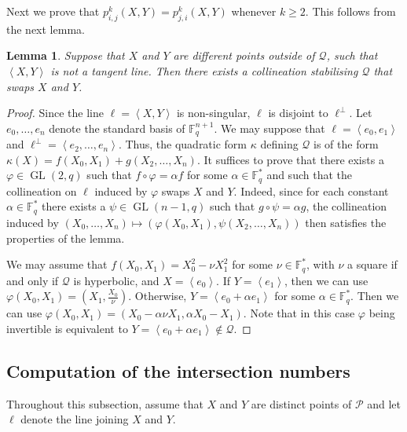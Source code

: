 \documentclass[a4paper]{article}
\newtheorem{lm}[thm]{Lemma}
\theoremstyle{definition}
\newcommand{\FF}{\mathbb F}
\newcommand{\vspan}[1]{\left \langle #1 \right \rangle}
\newcommand{\pp}{\mathcal P}
\newcommand{\mq}{\mathcal Q}
\DeclareMathOperator{\GL}{GL}
\begin{document}
Next we prove that $p^k_{i,j}(X,Y) = p^k_{j,i}(X,Y)$ whenever $k \geq 2$.
This follows from the next lemma.

\begin{lm}
 \label{lmHulp}
 Suppose that $X$ and $Y$ are different points outside of $\mq$, such that $\vspan{X,Y}$ is not a tangent line.
 Then there exists a collineation stabilising $\mq$ that swaps $X$ and $Y$.
\end{lm}

\begin{proof}
 Since the line $\ell = \vspan{X,Y}$ is non-singular, $\ell$ is disjoint to $\ell^\perp$.
 Let $e_0, \dots, e_n$ denote the standard basis of $\FF_q^{n+1}$.
 We may suppose that $\ell = \vspan{e_0, e_1}$ and $\ell^\perp = \vspan{e_2, \dots, e_n}$.
 Thus, the quadratic form $\kappa$ defining $\mq$ is of the form $\kappa(X) = f(X_0,X_1) + g(X_2, \dots, X_n)$.
 It suffices to prove that there exists a $\varphi \in \GL(2,q)$ such that $f \circ \varphi = \alpha f$ for some $\alpha \in \FF_q^*$ and such that the collineation on $\ell$ induced by $\varphi$ swaps $X$ and $Y$.
 Indeed, since for each constant $\alpha \in \FF_q^*$ there exists a $\psi \in \GL(n-1,q)$ such that $g \circ \psi = \alpha g$, the collineation induced by $(X_0, \dots, X_n) \mapsto (\varphi(X_0,X_1), \psi(X_2, \dots, X_n))$ then satisfies the properties of the lemma.
 
 We may assume that $f(X_0,X_1) = X_0^2 - \nu X_1^2$ for some $\nu \in \FF_q^*$, with $\nu$ a square if and only if $\mq$ is hyperbolic, and $X = \vspan{e_0}$.
 If $Y = \vspan{e_1}$, then we can use $\varphi(X_0,X_1) = \left( X_1, \frac{X_0}\nu \right)$.
 Otherwise, $Y = \vspan{e_0 + \alpha e_1}$ for some $\alpha \in \FF_q^*$.
 Then we can use $\varphi(X_0,X_1) = (X_0 - \alpha \nu X_1, \alpha X_0 - X_1)$.
 Note that in this case $\varphi$ being invertible is equivalent to $Y = \vspan{e_0 + \alpha e_1} \notin \mq$.
\end{proof}

\subsection{Computation of the intersection numbers}

Throughout this subsection, assume that $X$ and $Y$ are distinct points of $\pp$ and let $\ell$ denote the line joining $X$ and $Y$.
\end{document}
